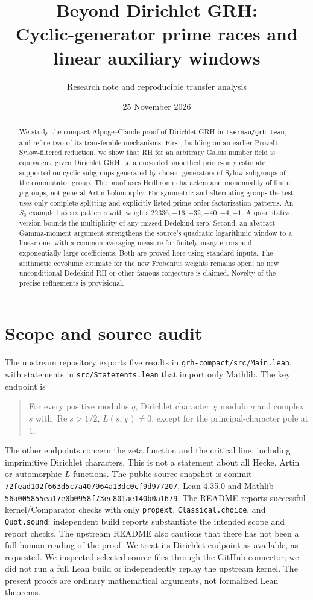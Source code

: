 \documentclass[11pt]{article}
\title{\color{ink}\bfseries Beyond Dirichlet GRH:\\Cyclic-generator prime races and linear auxiliary windows}
\author{Research note and reproducible transfer analysis}
\date{25 November 2026}
\theoremstyle{remark}\newtheorem{remark}[theorem]{Remark}
\DeclareMathOperator{\Ree}{Re}
\begin{document}
\maketitle
\begin{abstract}
We study the compact Alp\"oge--Claude proof of Dirichlet GRH in
\texttt{lsernau/grh-lean}, and refine two of its transferable mechanisms.
First, building on an earlier ProveIt Sylow-filtered reduction, we show
that RH for an arbitrary Galois number field is equivalent, given
Dirichlet GRH, to a one-sided smoothed prime-only estimate supported on
cyclic subgroups generated by chosen generators of Sylow subgroups of
the commutator group. The proof uses Heilbronn characters and monomiality
of finite $p$-groups, not general Artin holomorphy. For symmetric and
alternating groups the test uses only complete splitting and explicitly
listed prime-order factorization patterns. An $S_8$ example has six
patterns with weights $22336,-16,-32,-40,-4,-1$. A quantitative version
bounds the multiplicity of any missed Dedekind zero. Second, an abstract
Gamma-moment argument strengthens the source's quadratic logarithmic
window to a linear one, with a common averaging measure for finitely
many errors and exponentially large coefficients. Both are proved here
using standard inputs. The arithmetic covolume estimate for the new
Frobenius weights remains open; no new unconditional Dedekind RH or
other famous conjecture is claimed. Novelty of the precise refinements
is provisional.
\end{abstract}
\clearpage
\tableofcontents

\section{Scope and source audit}
The upstream repository \cite{upstream} exports five results in
\texttt{grh-compact/src/Main.lean}, with statements in
\texttt{src/Statements.lean} that import only Mathlib. The key endpoint is
\begin{quote}
\small For every positive modulus $q$, Dirichlet character $\chi$ modulo
$q$ and complex $s$ with $\Ree s>1/2$, $L(s,\chi)\ne0$, except for the
principal-character pole at $1$.
\end{quote}
The other endpoints concern the zeta function and the critical line,
including imprimitive Dirichlet characters. This is not a statement
about all Hecke, Artin or automorphic $L$-functions. The public source
snapshot is commit \texttt{72fead102f663d5c7a407964a13dc0cf9d977207}, Lean
4.35.0 and Mathlib \texttt{56a005855ea17e0b0958f73ec801ae140b0a1679}.
The README reports successful kernel/Comparator checks with only
\texttt{propext}, \texttt{Classical.choice}, and \texttt{Quot.sound};
independent build reports \cite{mit,sonoda} substantiate the intended
scope and report checks. The upstream README also cautions that there
has not been a full human reading of the proof. We treat its Dirichlet
endpoint as available, as requested. We inspected selected source
files through the GitHub connector; we did not run a full Lean build
or independently replay the upstream kernel. The present proofs are
ordinary mathematical arguments, not formalized Lean theorems.
\end{document}
